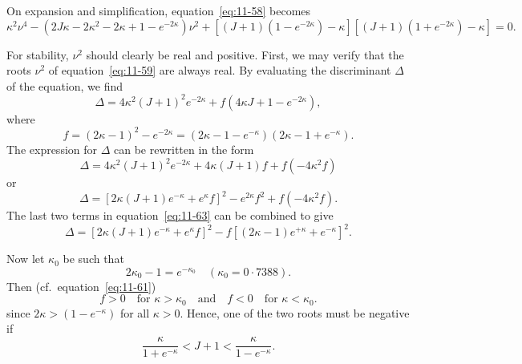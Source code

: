 On expansion and simplification, equation~\eqref{eq:11-58} becomes
\begin{equation}
\label{eq:11-59}
\kappa^2\nu^4-(2J\kappa-2\kappa^2-2\kappa+1-e^{-2\kappa})\nu^2+\left[(J+1)(1-e^{-2\kappa})-\kappa\right]\!\left[(J+1)(1+e^{-2\kappa})-\kappa\right] = 0.
\end{equation}

For stability, $\nu^2$ should clearly be real and positive. First, we may verify that the roots $\nu^2$ of equation~\eqref{eq:11-59} are always real. By evaluating the discriminant $\Delta$ of the equation, we find
\begin{equation}
\label{eq:11-60}
\Delta = 4\kappa^2(J+1)^2 e^{-2\kappa}+f(4\kappa J+1-e^{-2\kappa}),
\end{equation}
where
\begin{equation}
\label{eq:11-61}
f = (2\kappa-1)^2-e^{-2\kappa} = (2\kappa-1-e^{-\kappa})(2\kappa-1+e^{-\kappa}).
\end{equation}
The expression for $\Delta$ can be rewritten in the form
\begin{equation}
\label{eq:11-62}
\Delta = 4\kappa^2(J+1)^2 e^{-2\kappa}+4\kappa(J+1)f+f(-4\kappa^2 f)
\end{equation}
or
\begin{equation}
\label{eq:11-63}
\Delta = \left[2\kappa(J+1)e^{-\kappa}+e^{\kappa} f\right]^2-e^{2\kappa} f^2+f(-4\kappa^2 f).
\end{equation}
The last two terms in equation~\eqref{eq:11-63} can be combined to give
\begin{equation}
\label{eq:11-64}
\Delta = \left[2\kappa(J+1)e^{-\kappa}+e^{\kappa} f\right]^2-f\!\left[(2\kappa-1)e^{+\kappa}+e^{-\kappa}\right]^2.
\end{equation}

Now let $\kappa_0$ be such that
\begin{equation}
\label{eq:11-65}
2\kappa_0-1 = e^{-\kappa_0} \quad (\kappa_0 = 0{\cdot}7388).
\end{equation}
Then (cf.\ equation~\eqref{eq:11-61})
\begin{equation}
\label{eq:11-66}
f > 0 \quad\text{for } \kappa > \kappa_0 \quad\text{and}\quad f < 0 \quad\text{for } \kappa < \kappa_0.
\end{equation}
since $2\kappa > (1-e^{-\kappa})$ for all $\kappa > 0$. Hence, one of the two roots must be negative if
\begin{equation}
\label{eq:11-68}
\frac{\kappa}{1+e^{-\kappa}} < J+1 < \frac{\kappa}{1-e^{-\kappa}}.
\end{equation}

